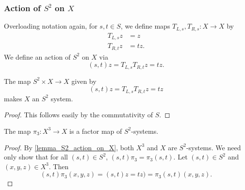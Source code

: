 

\subsubsection{Action of $S^2$ on $X$}

Overloading notation again, for $s, t \in S$, we define maps $T_{L,s}, T_{R,s}: X \to X$ by
\begin{align*}
    T_{L,s}z &= z\\
    T_{R,t}z &= tz.
\end{align*}
We define an action of $S^2$ on $X$ via
\[(s,t)z = T_{L,s}T_{R,t}z = tz.\]

\begin{lemma}[Action of $S^2$ on $X$]
    \label{lemma_S2_action_on_X}
    \leanok{}
    The map $S^2 \times X \to X$ given by
    \[(s,t)z = T_{L,s}T_{R,t}z = tz\]
    makes $X$ an $S^2$ system.
\end{lemma}

\begin{proof}
\leanok{}
    This follows easily by the commutativity of $S$.
\end{proof}

\begin{lemma}
    \label{lemma_x3_to_x_is_S2_factor_map}
    \leanok{}
    The map $\pi_3: X^3 \to X$ is a factor map of $S^2$-systems.
\end{lemma}

\begin{proof}
\leanok{}
    By \cref{lemma_S2_action_on_X}, both $X^3$ and $X$ are $S^2$-systems.  We need only show that for all $(s,t) \in S^2$, $(s,t) \pi_{3} = \pi_{3} (s,t)$. Let $(s,t) \in S^2$ and $(x,y,z) \in X^3$.  Then
    \[(s,t) \pi_{3} (x,y,z) = (s,t)z = tz) = \pi_{3} (s,t) (x,y,z).\]
\end{proof}

